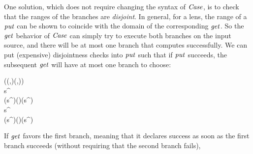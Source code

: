 One solution, which does not require changing the syntax of \ensuremath{\Conid{Case}}, is to check that the ranges of the branches are \emph{disjoint}.
In general, for a lens, the range of a \ensuremath{\Varid{put}} can be shown to coincide with the domain of the corresponding \ensuremath{\Varid{get}}.
So the \ensuremath{\Varid{get}} behavior of \ensuremath{\Conid{Case}} can simply try to execute both branches on the input source, and there will be at most one branch that computes successfully.
We can put (expensive) disjointness checks into \ensuremath{\Varid{put}} such that if \ensuremath{\Varid{put}} succeeds, the subsequent \ensuremath{\Varid{get}} will have at most one branch to choose:
\begin{hscode}\SaveRestoreHook
{}%
%
%
%
%
%
%
%
%
%
\>[B]{}\;(\;(,)\;(,))\;\;\mathrel{=}{}\<[E]%
\\
\>[B]{}\<[3]%
\>[3]{}\;{}\<[12]%
\>[12]{}\;{}\<[16]%
\>[16]{}\;\;{}\<[21]%
\>[21]{}\;{}\<[27]%
\>[27]{}\;{}\<[31]%
\>[31]{}s^\prime\leftarrow {}\;\;{}\<[44]%
\>[44]{}\;\<[E]%
\\
\>[31]{}\;(\;s^\prime)\;(\;)\;(\;\;{}\<[73]%
\>[73]{}s^\prime){}\<[E]%
\\
\>[B]{}\<[3]%
\>[3]{}\;\;{}\<[12]%
\>[12]{}\;{}\<[16]%
\>[16]{}\;\;{}\<[21]%
\>[21]{}\;{}\<[27]%
\>[27]{}\;{}\<[31]%
\>[31]{}s^\prime\leftarrow {}\;\;{}\<[44]%
\>[44]{}\;\<[E]%
\\
\>[31]{}\;(\;s^\prime)\;(\;)\;(\;\;{}\<[73]%
\>[73]{}s^\prime){}\<[E]%
\\
\>[B]{}\<[3]%
\>[3]{}\;\<[E]%
\ColumnHook
\end{hscode}\resethooks
If \ensuremath{\Varid{get}} favors the first branch, meaning that it declares success as soon as the first branch succeeds (without requiring that the second branch fails),
